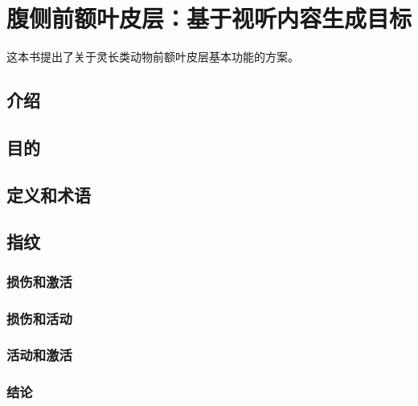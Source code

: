 \chapter{腹侧前额叶皮层：基于视听内容生成目标}
这本书提出了关于灵长类动物前额叶皮层基本功能的方案。

\section{介绍}

\section{目的}

\section{定义和术语}


\section{指纹}

\subsection{损伤和激活}

\subsection{损伤和活动}

\subsection{活动和激活}




\subsection{结论}


